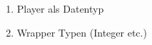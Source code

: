 
\begin{enumerate}
    \item Player als Datentyp
    \item Wrapper Typen (Integer etc.)
\end{enumerate}
